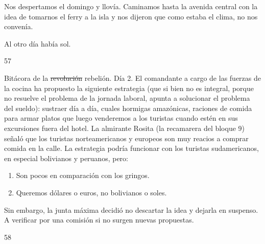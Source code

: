 \documentclass[12pt,twoside,openright,a5paper]{book}
\begin{document}
\nopagebreak

\vspace{0.5cm}

\nopagebreak

Nos despertamos el domingo y llovía. Caminamos hasta la avenida central
con la idea de tomarnos el ferry a la isla y nos dijeron que como estaba
el clima, no nos convenía.

Al otro día había sol.


\vspace{0.5cm}

\hrulefill \hspace{0.1cm}\decofourleft\hspace{0.2cm} 57 \hspace{0.2cm}\decofourright \hspace{0.1cm}\hrulefill

\nopagebreak

\vspace{0.5cm}

\nopagebreak

Bitácora de la \st{revolución} rebelión. Día 2. El comandante a cargo de las fuerzas de
la cocina ha propuesto la siguiente estrategia (que si bien no es integral,
porque no resuelve el problema de la jornada laboral, apunta a solucionar
el problema del sueldo): sustraer día a día, cuales hormigas amazónicas,
raciones de comida para armar platos que luego venderemos a los turistas
cuando estén en sus excursiones fuera del hotel. La almirante Rosita
(la recamarera del bloque 9) señaló que los turistas norteamericanos
y europeos son muy reacios a comprar comida en la calle. La estrategia
podría funcionar con los turistas sudamericanos, en especial bolivianos
y peruanos, pero:

\begin{enumerate}
\item Son pocos en comparación con los gringos.
\item Queremos dólares o euros, no bolivianos o soles.
\end{enumerate}

Sin embargo, la junta máxima decidió no descartar la idea y dejarla en
suspenso. A verificar por una comisión si no surgen nuevas propuestas.

\vspace{0.5cm}
\afterpage{}
\hrulefill \hspace{0.1cm}\decofourleft\hspace{0.2cm} 58 \hspace{0.2cm}\decofourright \hspace{0.1cm}\hrulefill
\end{document}
